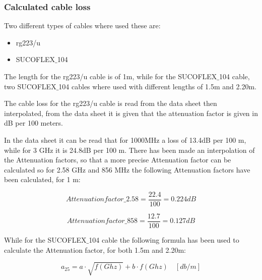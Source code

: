 \subsubsection{Calculated cable loss}
Two different types of cables where used these are:

\begin{itemize}
\item rg223/u 
\item SUCOFLEX$\_$104
\end{itemize}

The length for the  rg223/u cable is of 1m, while for the SUCOFLEX$\_$104 cable, two SUCOFLEX$\_$104 cables where used with different lengths of 1.5m and 2.20m.

The cable loss for the rg223/u cable is read from the data sheet then interpolated, from the data sheet it is given that the attenuation factor is given in dB per 100 meters. 


In the data sheet it can be read that for 1000MHz a loss of  13.4dB per 100 m, while for 3 GHz it is 24.8dB per 100 m. There has been made an interpolation of the Attenuation factors, so that a more precise Attenuation factor can be calculated so for 2.58 GHz and 856 MHz the following Attenuation factors have been calculated, for 1 m:

\begin{equation}
Attenuation factor\_2.58 = \frac{22.4}{100}  = 0.224dB
\end{equation}

\begin{equation}
Attenuation factor\_858 = \frac{12.7}{100}  = 0.127dB
\end{equation}

While for the SUCOFLEX$\_$104 cable the following formula has been used to calculate the Attenuation factor, for both 1.5m and 2.20m:

\begin{equation}
a_{25} = a\cdot \sqrt{f(Ghz)} + b \cdot f(Ghz) \quad [db/m]
\end{equation}

\begin{where}
\end{where}

